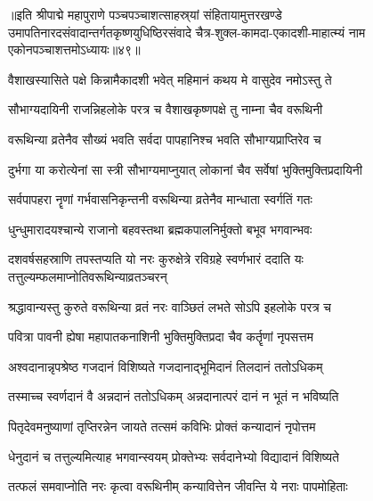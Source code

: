 ॥इति श्रीपाद्मे महापुराणे पञ्चपञ्चाशत्साहस्र्यां संहितायामुत्तरखण्डे उमापतिनारदसंवादान्तर्गतकृष्णयुधिष्ठिरसंवादे चैत्र-शुक्ल-कामदा-एकादशी-माहात्म्यं नाम एकोनपञ्चाशत्तमोऽध्यायः॥४९॥


\hyperref[sec:ekadashi_mahatmyam_padma_puranam]{\closesub}
\clearpage

\label{sec:padma-vaishakha-krishna-varuthini ekadashi}



\twolineshloka
{वैशाखस्यासिते पक्षे किन्नामैकादशी भवेत्}
{महिमानं कथय मे वासुदेव नमोऽस्तु ते}%


\twolineshloka
{सौभाग्यदायिनी राजन्निहलोके परत्र च}
{वैशाखकृष्णपक्षे तु नाम्ना चैव वरूथिनी}%

\twolineshloka
{वरूथिन्या व्रतेनैव सौख्यं भवति सर्वदा}
{पापहानिश्च भवति सौभाग्यप्राप्तिरेव च}%

\twolineshloka
{दुर्भगा या करोत्येनां सा स्त्री सौभाग्यमाप्नुयात्}
{लोकानां चैव सर्वेषां भुक्तिमुक्तिप्रदायिनी}%

\twolineshloka
{सर्वपापहरा नॄणां गर्भवासनिकृन्तनी}
{वरूथिन्या व्रतेनैव मान्धाता स्वर्गतिं गतः}%

\twolineshloka
{धुन्धुमारादयश्चान्ये राजानो बहवस्तथा}
{ब्रह्मकपालनिर्मुक्तो बभूव भगवान्भवः}%

\threelineshloka
{दशवर्षसहस्राणि तपस्तप्यति यो नरः}
{कुरुक्षेत्रे  रविग्रहे स्वर्णभारं ददाति यः}
{तत्तुल्यम्फलमाप्नोतिवरूथिन्याव्रतञ्चरन्}%

\twolineshloka
{श्रद्धावान्यस्तु कुरुते वरूथिन्या व्रतं नरः}
{वाञ्छितं लभते सोऽपि इहलोके परत्र च}%

\twolineshloka
{पवित्रा पावनी ह्येषा महापातकनाशिनी}
{भुक्तिमुक्तिप्रदा चैव कर्तॄणां नृपसत्तम}%

\twolineshloka
{अश्वदानान्नृपश्रेष्ठ गजदानं विशिष्यते}
{गजदानाद्भूमिदानं तिलदानं ततोऽधिकम्}%

\twolineshloka
{तस्माच्च स्वर्णदानं वै अन्नदानं ततोऽधिकम्}
{अन्नदानात्परं दानं न भूतं न भविष्यति}%

\twolineshloka
{पितृदेवमनुष्याणां तृप्तिरन्नेन जायते}
{तत्समं कविभिः प्रोक्तं कन्यादानं नृपोत्तम}%

\twolineshloka
{धेनुदानं च तत्तुल्यमित्याह भगवान्स्वयम्}
{प्रोक्तेभ्यः सर्वदानेभ्यो विद्यादानं विशिष्यते}%

\twolineshloka
{तत्फलं समवाप्नोति नरः कृत्वा वरूथिनीम्}
{कन्यावित्तेन जीवन्ति ये नराः पापमोहिताः}%

